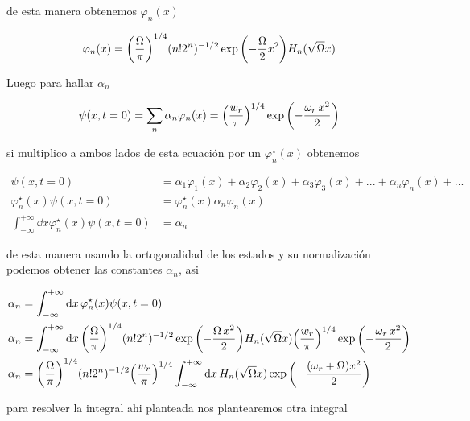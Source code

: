 \documentclass[../Main.tex]{subfiles}
\begin{document}
de esta manera obtenemos $ \varphi_n(x) $

\begin{equation}
\varphi_n(x)=\pqty{\frac{\Omega}{\pi}}^{1/4}(n!2^n)^{-1/2} \exp \pqty{- \frac{\Omega}{2}x^2} H_n(\sqrt{\Omega} x)
\end{equation}

Luego para hallar $ \alpha_n $

 

\begin{equation}
	\psi (x,t=0)=\sum_n\alpha_n\varphi_n(x)=\pqty{\frac{w_r}{\pi}}^{1/4}\exp \pqty{- \frac{\omega_{r} \, x^2}{2}}
\end{equation}

si multiplico a ambos lados de esta ecuación por un $ \varphi^{\star}_n(x) $ obtenemos

\begin{equation}
\begin{split}
\psi (x,t=0) & =\alpha_1\varphi_1(x)+\alpha_2\varphi_2(x)+\alpha_3\varphi_3(x)+...+\alpha_n\varphi_n(x)+...\\
\varphi^{\star}_n(x)\psi (x,t=0)&=\varphi^{\star}_n(x)\alpha_n\varphi_n(x) \\
\int_{-\infty}^{+\infty}\dd{x}\varphi^{\star}_n(x)\psi (x,t=0)&=\alpha_n
\end{split}
\end{equation}

de esta manera usando la ortogonalidad  de los estados y su normalización podemos obtener las constantes $ \alpha_n $, asi

\begin{equation}
\begin{split}
\alpha_n & =\int_{-\infty}^{+\infty}\dd{x}\varphi^{\star}_n(x)\psi (x,t=0)\\
\alpha_n & =\int_{-\infty}^{+\infty}\dd{x}\pqty{\frac{\Omega}{\pi}}^{1/4}(n!2^n)^{-1/2} \exp \pqty{- \frac{\Omega \, x^2}{2}} H_n(\sqrt{\Omega} x) \pqty{\frac{w_r}{\pi}}^{1/4}\exp \pqty{- \frac{\omega_{r} \, x^2}{2}}\\
\alpha_n & = \pqty{\frac{\Omega}{\pi}}^{1/4}(n!2^n)^{-1/2}\pqty{\frac{w_r}{\pi}}^{1/4}\int_{-\infty}^{+\infty}\dd{x} H_n(\sqrt{\Omega} x)\exp \pqty{- \frac{\pqty{\omega_{r}+\Omega} x^2}{2}}
\end{split}
\end{equation}

para resolver la integral ahi planteada nos plantearemos otra integral
\end{document}
